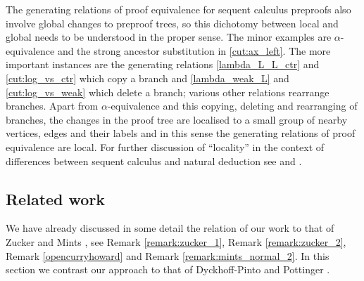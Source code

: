 \documentclass[english,letter paper,12pt,leqno]{article}
\theoremstyle{example}
\numberwithin{equation}{section}
\begin{document}
The generating relations of proof equivalence for sequent calculus preproofs also involve global changes to preproof trees, so this dichotomy between local and global needs to be understood in the proper sense. The minor examples are $\alpha$-equivalence and the strong ancestor substitution in \eqref{cut:ax_left}. The more important instances are the generating relations \eqref{lambda_L_L_ctr} and \eqref{cut:log_vs_ctr} which copy a branch and \eqref{lambda_weak_L} and \eqref{cut:log_vs_weak} which delete a branch; various other relations rearrange branches. Apart from $\alpha$-equivalence and this copying, deleting and rearranging of branches, the changes in the proof tree are localised to a small group of nearby vertices, edges and their labels and in this sense the generating relations of proof equivalence are local. For further discussion of ``locality'' in the context of differences between sequent calculus and natural deduction see \cite[\S 3]{negriplato} and \cite{negri}.


\subsection{Related work}\label{section:related_work}

We have already discussed in some detail the relation of our work to that of Zucker \cite{zucker} and Mints \cite{mints}, see Remark \ref{remark:zucker_1}, Remark \ref{remark:zucker_2}, Remark \ref{opencurryhoward} and Remark \ref{remark:mints_normal_2}. In this section we contrast our approach to that of  Dyckhoff-Pinto \cite{dyckhoffpinto} and Pottinger \cite{pottinger}.
\end{document}
